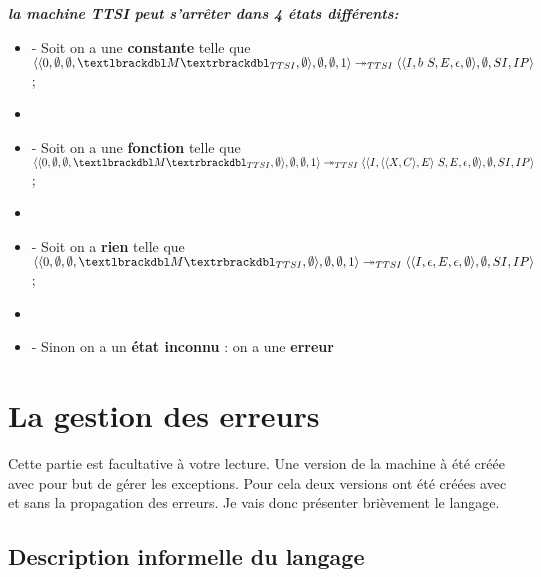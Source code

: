 \documentclass[10pt,a4paper]{report}
\begin{document}
\textbf{\textit{la machine TTSI peut s'arrêter dans 4 états différents:}}
\smallbreak
\begin{itemize}
\item[] - Soit on a une \textbf{constante} telle que 
  $\langle\langle 0,\emptyset,\emptyset,\textlbrackdbl M\textrbrackdbl_{TTSI},\emptyset\rangle,\emptyset,\emptyset,1\rangle 
  \twoheadrightarrow_{TTSI} 
  \langle\langle I,b~S,E,\epsilon,\emptyset\rangle,\emptyset,SI,IP\rangle$;
\item[] 
\item[] - Soit on a une \textbf{fonction} telle que
  $\langle\langle 0,\emptyset,\emptyset,\textlbrackdbl M\textrbrackdbl_{TTSI},\emptyset\rangle,\emptyset,\emptyset,1\rangle 
  \twoheadrightarrow_{TTSI} 
  \langle\langle I,\langle\langle X,C\rangle,E\rangle~S,E,\epsilon,\emptyset\rangle,\emptyset,SI,IP\rangle$;
\item[] 
\item[] - Soit on a \textbf{rien} telle que  
$\langle\langle 0,\emptyset,\emptyset,\textlbrackdbl M\textrbrackdbl_{TTSI},\emptyset\rangle,\emptyset,\emptyset,1\rangle 
\twoheadrightarrow_{TTSI} 
\langle\langle I,\epsilon,E,\epsilon,\emptyset\rangle,\emptyset,SI,IP\rangle$;
\item[]
\item[] - Sinon on a un \textbf{état inconnu} : on a une \textbf{erreur} 
\end{itemize}
\newpage



\section{La gestion des erreurs}

Cette partie est facultative à votre lecture. Une version de la machine à été créée avec pour but de gérer les exceptions. Pour cela deux versions ont été créées avec et sans la propagation des erreurs. Je vais donc présenter brièvement le langage.

\subsection{Description informelle du langage}
\end{document}
